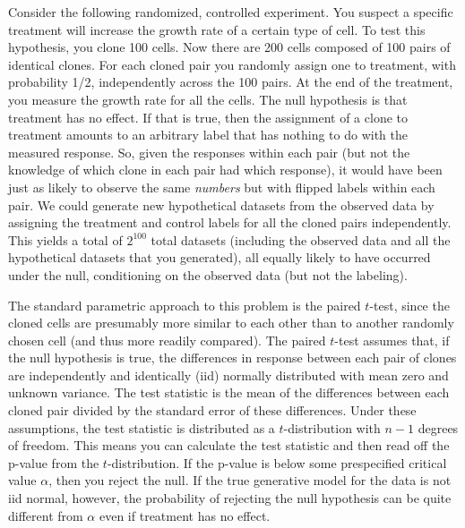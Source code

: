 

\begin{example}[label=exa:cont] Consider the following randomized, controlled
experiment.  You suspect a specific treatment will increase the growth rate of
a certain type of cell.  To test this hypothesis, you clone 100 cells. Now
there are 200 cells composed of 100 pairs of identical clones. For each cloned
pair you randomly assign one to treatment, with probability 1/2, independently
across the 100 pairs.  At the end of the treatment, you measure the growth rate
for all the cells.  The null hypothesis is that treatment has no effect.
If that is true, then the assignment of a clone to treatment amounts to an
arbitrary label that has nothing to do with the measured response.  So, given
the responses within each pair (but not the knowledge of which clone in each
pair had which response), it would have been just as likely to observe
the same \emph{numbers} but with flipped labels within each pair.
We could
generate new hypothetical datasets from the observed data by assigning the
treatment and control labels for all the cloned pairs independently.  This
yields a total of $2^{100}$ total datasets (including the observed data and all
the hypothetical datasets that you generated), all equally likely to have
occurred under the null, conditioning on the observed data (but not the labeling).

The standard parametric approach to this problem is the paired $t$-test, since
the cloned cells are presumably more similar to each other than to another
randomly chosen cell (and thus more readily compared).  The paired $t$-test
assumes that, if the null hypothesis is true, the differences in response
between each pair of clones are 
independently and identically (iid) normally distributed with mean zero and unknown variance.
The test statistic is the mean of the differences between each cloned pair
divided by the standard error of these differences.  
Under these assumptions, the test statistic is
distributed as a $t$-distribution with $n-1$ degrees of freedom.  This means you can
calculate the test statistic and then read off the p-value from the
$t$-distribution.  If the p-value is below some prespecified critical value
$\alpha$, then you reject the null.  
If the true generative model for the data is not iid normal, however, the
probability of rejecting the null hypothesis can be quite different from $\alpha$
even if treatment has no effect.


\end{example}
